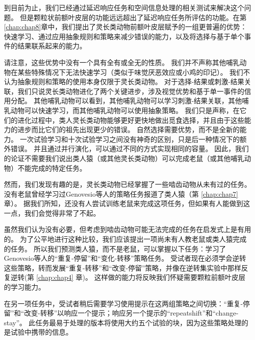 到目前为止，我们已经通过延迟响应任务和空间信息处理的相关测试来解决这个问题。
但是颗粒状前额叶皮层的功能远远超出了延迟响应任务所评估的功能。在第\ref{chap:chap8}章中，我们提出了灵长类动物前额叶皮层赋予的一组更普遍的优势：快速学习、通过应用抽象规则和策略来减少错误的能力，以及将选择与基于单个事件的结果联系起来的能力。
\par


请注意，这些优势中没有一个具有全有或全无的性质。
我们并不声称其他哺乳动物在某些特殊情况下无法快速学习（类似于味觉厌恶效应或小鸡的印记）。
我们不认为抽象规则和策略的使用本身仅限于灵长类动物。
对于选择-结果或刺激-结果关联，我们只说灵长类动物进化了两个关键进步，涉及视觉优势和基于单一事件的信用分配。
其他哺乳动物可以看到，其他哺乳动物可以学习刺激-结果关联，其他哺乳动物可以快速学习，而其他哺乳动物可以使用抽象策略。
我们只是声称，在它们的进化过程中，类人灵长类动物能够更好更快地做出觅食选择，并且由于这些能力的进步而比它们的祖先出现更少的错误。
自然选择需要优势，而不是全新的能力。
一次试验学习和十次试验学习之间没有神奇的区别，只是后一种情况下的额外错误。
并且通过并行演化，可以通过不同的方式实现相同的容量。
因此，我们的论证不需要我们说出类人猿（或其他灵长类动物）可以完成老鼠（或其他哺乳动物）不能完成的特定任务。
\par


然而，我们发现有趣的是，灵长类动物已经掌握了一些啮齿动物从未有过的任务。没有老鼠曾经学习过Genovesio等人的策略任务\cite{genovesio2005prefrontal}报道了类人猿（第 \ref{chap:chap7} 章）。
据我们所知，还没有人尝试训练老鼠来完成这项任务，但如果有人能做到这一点，我们会觉得非常了不起。
\par


虽然我们认为没有必要，但考虑到啮齿动物可能无法完成的任务在启发式上是有用的。
为了公平地进行这种比较，我们应该提出一项尚未有人教老鼠或类人猿完成的任务。
所以我们预测类人猿，而不是老鼠，可以掌握以下任务：学习了 Genovesio等人\cite{genovesio2005prefrontal}的“重复-停留”和“变化-转移”策略任务。
受试者现在必须学会逆转这些策略，转而发展“重复-转移”和“改变-停留”策略，并像在逆转集实验中那样反复逆转(第 \ref{chap:chap4} 章)。
这样做的能力将反映我们怀疑需要颗粒前额叶皮层的学习能力。
\par


在另一项任务中，受试者稍后需要学习使用提示在这两组策略之间切换：“重复-停留”和“改变-转移”以响应一个提示；响应另一个提示的“repeatshift”和“change-stay”。
此任务最易于处理的版本将使用大约五个试验的块，因为这些策略处理的是试验中携带的信息。
\par


